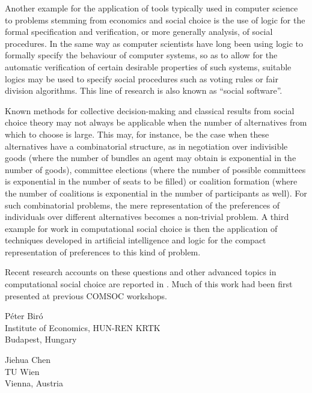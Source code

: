 \documentclass{comsoc2025}
\begin{document}
Another example for the application of tools typically used in computer science to problems stemming from economics and social choice is the use of logic for the formal specification and verification, or more generally analysis, of social procedures. In the same way as computer scientists have long been using logic to formally specify the behaviour of computer systems, so as to allow for the automatic verification of certain desirable properties of such systems, suitable logics may be used to specify social procedures such as voting rules or fair division algorithms. This line of research is also known as ``social software''.

Known methods for collective decision-making and classical results from social choice theory may not always be applicable when the number of alternatives from which to choose is large.
This may, for instance, be the case when these alternatives have a combinatorial structure, as in negotiation over indivisible goods (where the number of bundles an agent may obtain is exponential in the number of goods),  committee elections (where the number of possible committees is exponential in the number of seats to be filled) or coalition formation
(where the number of coalitions is exponential in the number of participants as well).
For such combinatorial problems, the mere representation of the preferences of individuals over different alternatives becomes a non-trivial problem. A third example for work in computational social choice is then the application of techniques developed in artificial intelligence and logic for the compact representation of preferences to this kind of problem.

Recent research accounts on these questions and other advanced topics in computational social choice are reported in \citet{end:b:trends-in-computational-social-choice}. Much of this work had been first presented at previous COMSOC workshops.





\begin{contact}
P{\'e}ter Bir{\'o}\\
Institute of Economics, HUN-REN KRTK\\
Budapest, Hungary\\
\end{contact}

\begin{contact}
Jiehua Chen\\
TU Wien\\
Vienna, Austria\\
\end{contact}

\end{document}

